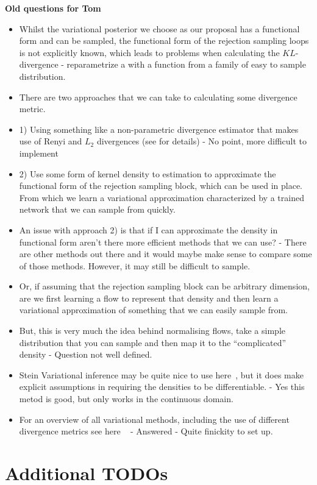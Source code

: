 \documentclass{article}
\begin{document}
\textbf{Old questions for Tom}
\begin{itemize}
  \item Whilst the variational posterior we choose as our proposal has a functional form  
  and can be sampled, the functional form of the rejection sampling loops is not explicitly known,
  which leads to problems when calculating the $KL$-divergence - reparametrize a with a function from a family of easy to sample distribution. 
  \item There are two approaches that we can take to calculating some divergence metric. 
  \item 1) Using something like a non-parametric divergence estimator that makes use of Renyi and $L_{2}$ divergences (see \cite{basseville2013divergence} for details) - No point, more difficult to implement
  \item 2) Use some form of kernel density to estimation to approximate the functional form of the rejection sampling 
  block, which can be used in place. From which we learn a variational approximation characterized by a trained network that we can sample from quickly. 
  \item An issue with approach 2) is that if I can approximate the density in functional form aren't there more efficient methods that we can use? - There are other methods out there and it would maybe make sense to compare some of those methods. However, it may still be difficult to sample. 
  \item Or, if assuming that the rejection sampling block can be arbitrary dimension, are we first learning a flow to represent that density and then learn a variational approximation of something that we can easily sample from. 
  \item But, this is very much the idea behind normalising flows, take a simple distribution that you can sample and then map it to the ``complicated'' density - Question not well defined. 
  \item Stein Variational inference may be quite nice to use here~\cite{feng2017learning}, but it does make explicit assumptions in requiring the densities to be differentiable. - Yes this metod is good, but only works in the continuous domain. 
  \item  For an overview of all variational methods, including the use of different divergence metrics see here ~\cite{8588399} - Answered - Quite finickity to set up. 
\end{itemize}

\section{Additional TODOs}
\end{document}

